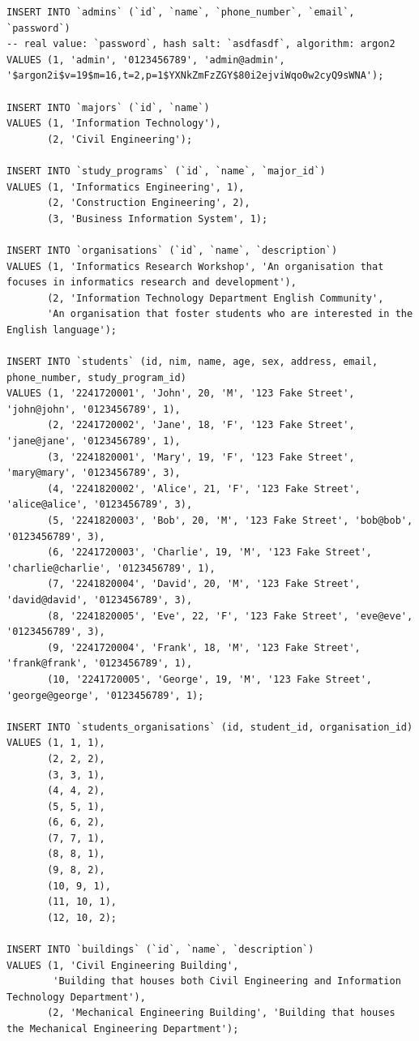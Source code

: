 \documentclass[12pt,titlepage]{article}
\begin{document}
\begin{verbatim}
INSERT INTO `admins` (`id`, `name`, `phone_number`, `email`, `password`)
-- real value: `password`, hash salt: `asdfasdf`, algorithm: argon2
VALUES (1, 'admin', '0123456789', 'admin@admin', '$argon2i$v=19$m=16,t=2,p=1$YXNkZmFzZGY$80i2ejviWqo0w2cyQ9sWNA');

INSERT INTO `majors` (`id`, `name`)
VALUES (1, 'Information Technology'),
       (2, 'Civil Engineering');

INSERT INTO `study_programs` (`id`, `name`, `major_id`)
VALUES (1, 'Informatics Engineering', 1),
       (2, 'Construction Engineering', 2),
       (3, 'Business Information System', 1);

INSERT INTO `organisations` (`id`, `name`, `description`)
VALUES (1, 'Informatics Research Workshop', 'An organisation that focuses in informatics research and development'),
       (2, 'Information Technology Department English Community',
       'An organisation that foster students who are interested in the English language');

INSERT INTO `students` (id, nim, name, age, sex, address, email, phone_number, study_program_id)
VALUES (1, '2241720001', 'John', 20, 'M', '123 Fake Street', 'john@john', '0123456789', 1),
       (2, '2241720002', 'Jane', 18, 'F', '123 Fake Street', 'jane@jane', '0123456789', 1),
       (3, '2241820001', 'Mary', 19, 'F', '123 Fake Street', 'mary@mary', '0123456789', 3),
       (4, '2241820002', 'Alice', 21, 'F', '123 Fake Street', 'alice@alice', '0123456789', 3),
       (5, '2241820003', 'Bob', 20, 'M', '123 Fake Street', 'bob@bob', '0123456789', 3),
       (6, '2241720003', 'Charlie', 19, 'M', '123 Fake Street', 'charlie@charlie', '0123456789', 1),
       (7, '2241820004', 'David', 20, 'M', '123 Fake Street', 'david@david', '0123456789', 3),
       (8, '2241820005', 'Eve', 22, 'F', '123 Fake Street', 'eve@eve', '0123456789', 3),
       (9, '2241720004', 'Frank', 18, 'M', '123 Fake Street', 'frank@frank', '0123456789', 1),
       (10, '2241720005', 'George', 19, 'M', '123 Fake Street', 'george@george', '0123456789', 1);

INSERT INTO `students_organisations` (id, student_id, organisation_id)
VALUES (1, 1, 1),
       (2, 2, 2),
       (3, 3, 1),
       (4, 4, 2),
       (5, 5, 1),
       (6, 6, 2),
       (7, 7, 1),
       (8, 8, 1),
       (9, 8, 2),
       (10, 9, 1),
       (11, 10, 1),
       (12, 10, 2);

INSERT INTO `buildings` (`id`, `name`, `description`)
VALUES (1, 'Civil Engineering Building',
        'Building that houses both Civil Engineering and Information Technology Department'),
       (2, 'Mechanical Engineering Building', 'Building that houses the Mechanical Engineering Department');


\end{verbatim}
\end{document}
